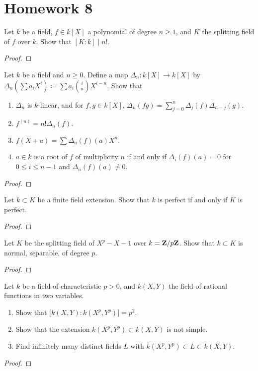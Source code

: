 \chapter{Homework 8}
\begin{problem}
Let $k$ be a field, $f\in k[X]$ a polynomial of degree $n\geq 1$, and $K$
the splitting field of $f$ over $k$. Show that $[K:k]\mid n!$.
\end{problem}
\begin{proof}
\end{proof}

\begin{problem}
Let $k$ be a field and $n\geq 0$. Define a map $\Delta_n\colon k[X]\to
k[X]$ by $\Delta_n\left(\sum a_iX^i\right)\coloneqq\sum a_i\binom{i}{n}
X^{i-n}$. Show that
\begin{enumerate}[label=(\alph*)]
\item $\Delta_n$ is $k$-linear, and for $f,g\in k[X]$,
  $\Delta_n(fg)=\sum_{j=0}^n\Delta_j(f)\Delta_{n-j}(g)$.
\item $f^{(n)}=n!\Delta_n(f)$.
\item $f(X+a)=\sum\Delta_n(f)(a)X^n$.
\item $a\in k$ is a root of $f$ of multiplicity $n$ if and only if
  $\Delta_i(f)(a)=0$ for $0\leq i\leq n-1$ and $\Delta_n(f)(a)\neq 0$.
\end{enumerate}
\end{problem}
\begin{proof}
\end{proof}

\begin{problem}
Let $k\subset K$ be a finite field extension. Show that $k$ is perfect if
and only if $K$ is perfect.
\end{problem}
\begin{proof}
\end{proof}

\begin{problem}
Let $K$ be the splitting field of $X^p-X-1$ over $k=\mathbf{Z}/p\mathbf{Z}$. Show that
$k\subset K$ is normal, separable, of degree $p$.
\end{problem}
\begin{proof}
\end{proof}

\begin{problem}
Let $k$ be a field of characteristic $p>0$, and $k(X,Y)$ the field of
rational functions in two variables.
\begin{enumerate}[label=(\alph*)]
\item Show that $\bigl[k(X,Y):k(X^p,Y^p)\bigr]=p^2$.
\item Show that the extension $k(X^p,Y^p)\subset k(X,Y)$ is not simple.
\item Find infinitely many distinct fields $L$ with $k(X^p,Y^p)\subset
  L\subset k(X,Y)$.
\end{enumerate}
\end{problem}
\begin{proof}
\end{proof}

